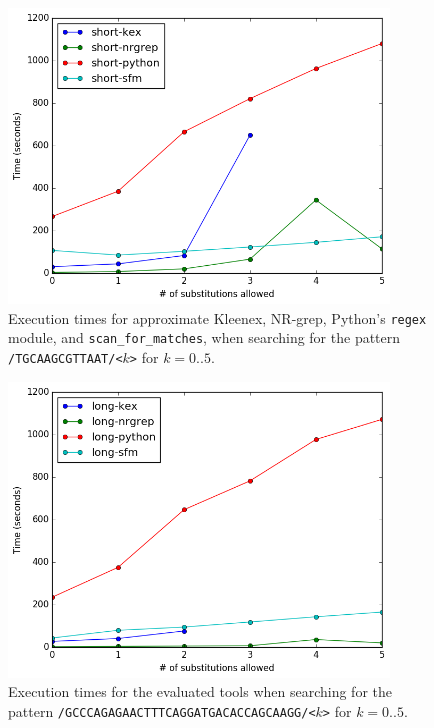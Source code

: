 \begin{figure}[!ht]
  \centering
  \includegraphics[width=0.9\textwidth]{images/short.png}
  \caption{Execution times for approximate Kleenex, NR-grep, Python's
    \texttt{regex} module, and \texttt{scan\_for\_matches}, when searching for
    the pattern \texttt{/TGCAAGCGTTAAT/<$k$>} for $k=0..5$.}
  \label{fig:short}
\end{figure}

\begin{figure}[!ht]
  \centering
  \includegraphics[width=0.9\textwidth]{images/long.png}
  \caption{Execution times for the evaluated tools when searching for the
    pattern \texttt{/GCCCAGAGAACTTTCAGGATGACACCAGCAAGG/<$k$>} for $k=0..5$.}
  \label{fig:long}
\end{figure}

